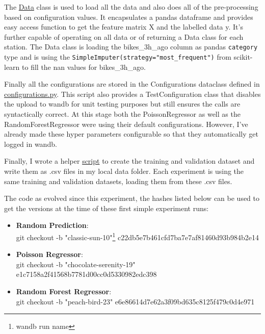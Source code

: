 \documentclass[a4paper]{article}
\begin{document}
    The \href{https://github.com/isabelladegen/mlp-2021/blob/c48d85dc364b5a2e7e59f16961b32f9e6c245735/src/Data.py}{Data} class
    is used to load all the data and also does all of the pre-processing based on configuration values. It encapsulates
    a pandas dataframe and provides easy access function to get the feature matrix X and the labelled data y. It's further
    capable of operating on all data or of returning a Data class for each station. The Data class is loading the
    bikes\_3h\_ago column as pandas \texttt{category} type and is using the
    \texttt{SimpleImputer(strategy="most\_frequent")} from scikit-learn to fill the nan values for bikes\_3h\_ago.

    Finally all the configurations are stored in the Configurations dataclass defined in
    \href{https://github.com/isabelladegen/mlp-2021/blob/c48d85dc364b5a2e7e59f16961b32f9e6c245735/src/configurations.py}{configurations.py}.
    This script also provides a TestConfiguration class that disables the upload to wandb for unit testing purposes but
    still ensures the calls are syntactically correct. At this stage both the PoissonRegressor as well as the RandomForestRegressor
    were using their default configurations. However,
    I've already made these hyper parameters configurable so that they automatically get logged in wandb.

    Finally, I wrote a helper \href{https://github.com/isabelladegen/mlp-2021/blob/c48d85dc364b5a2e7e59f16961b32f9e6c245735/src/create_dev_and_validation_csv.py}{script}
    to create the training and validation dataset and write them as .csv files in my local
    data folder. Each experiment is using the same training and validation datasets, loading them from these .csv files.

    The code as evolved since this experiment, the hashes listed below can be used to get the versions at the time of
    these first simple experiment runs:

    \begin{itemize}
        \item \textbf{Random Prediction}: \\git checkout -b "classic-sun-10"\footnote{\label{fn:wand-db-name}wandb run name} c22db5e7b461cfd7ba7e7af81460d93b984b2e14
        \item \textbf{Poisson Regressor}: \\git checkout -b "chocolate-serenity-19" e1c7158a2f41568b7781d00cc0d5330982edc398
        \item \textbf{Random Forest Regressor}: \\git checkout -b "peach-bird-23" e6e86614d7e62a3f09bd635c8125f479c0d4e971
    \end{itemize}
\end{document}
